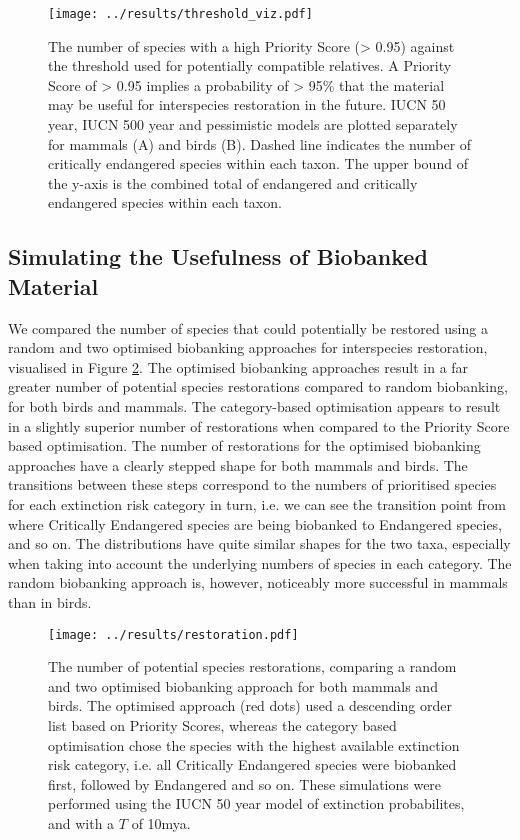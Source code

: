 \documentclass[12pt]{article}
\begin{document}
	\begin{figure}
		\centering
		\texttt{[image: ../results/threshold\_viz.pdf]}
		\caption{The number of species with a high Priority Score (> 0.95)
			against the threshold used for potentially compatible relatives.
			A Priority Score of > 0.95 implies a probability of >
			95\% that the material may be useful for interspecies restoration
			in the future. IUCN 50 year, IUCN 500 year and pessimistic models
			are plotted separately for mammals (A) and birds (B). Dashed line
			indicates the number of critically endangered species within each
			taxon. The upper bound of the y-axis is the combined total of
			endangered and critically endangered species within each taxon.
			}\label{thresh_viz}
	\end{figure}
	
	\subsection{Simulating the Usefulness of Biobanked Material}
	We compared the number of species that could potentially be restored using
	a random and two optimised biobanking approaches for interspecies restoration,
	visualised in Figure \ref{rest_sims}. The optimised biobanking approaches
	result in a far greater number of potential species restorations
	compared to random biobanking, for both birds and mammals. The category-based
	optimisation appears to result in a slightly superior number of restorations
	when compared to the Priority Score based optimisation. The number
	of restorations for the optimised biobanking approaches have a clearly stepped
	shape for both mammals and birds. The transitions between these steps
	correspond to the numbers of prioritised species for each extinction risk
	category in turn, i.e. we can see the transition point from where Critically
	Endangered species are being biobanked to Endangered species, and so on.
	The distributions have quite similar shapes for the two taxa, especially
	when taking into account the underlying numbers of species in each category.
	The random biobanking approach is, however, noticeably more successful in mammals
	than in birds.
	
	\begin{figure}
		\centering
		\texttt{[image: ../results/restoration.pdf]}
		\caption{The number of potential species restorations, comparing
		a random and two optimised biobanking approach for both mammals and birds.
		The optimised approach (red dots) used a descending order list based on
		Priority Scores, whereas the category based optimisation chose the species
		with the highest available extinction risk category, i.e. all Critically
		Endangered species were biobanked first, followed by Endangered
		and so on.
		These simulations were performed using the IUCN 50 year model of
		extinction probabilites, and with a $T$ of 10mya.}\label{rest_sims}
	\end{figure}
\end{document}
